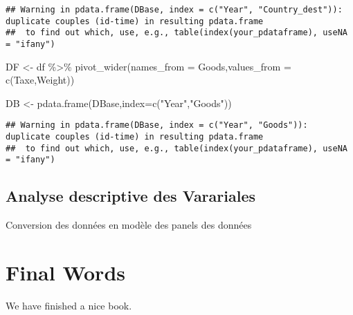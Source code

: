 \documentclass[
]{book}
\newenvironment{Shaded}{\begin{snugshade}}{\end{snugshade}}
\newcommand{\AttributeTok}[1]{\textcolor[rgb]{0.77,0.63,0.00}{#1}}
\newcommand{\FunctionTok}[1]{\textcolor[rgb]{0.00,0.00,0.00}{#1}}
\newcommand{\NormalTok}[1]{#1}
\newcommand{\OtherTok}[1]{\textcolor[rgb]{0.56,0.35,0.01}{#1}}
\newcommand{\SpecialCharTok}[1]{\textcolor[rgb]{0.00,0.00,0.00}{#1}}
\newcommand{\StringTok}[1]{\textcolor[rgb]{0.31,0.60,0.02}{#1}}
\begin{document}
\begin{verbatim}
## Warning in pdata.frame(DBase, index = c("Year", "Country_dest")): duplicate couples (id-time) in resulting pdata.frame
##  to find out which, use, e.g., table(index(your_pdataframe), useNA = "ifany")
\end{verbatim}

\begin{Shaded}
\begin{Highlighting}[]
\NormalTok{DF }\OtherTok{\textless{}{-}}\NormalTok{ df }\SpecialCharTok{\%\textgreater{}\%} \FunctionTok{pivot\_wider}\NormalTok{(}\AttributeTok{names\_from =}\NormalTok{ Goods,}\AttributeTok{values\_from =} \FunctionTok{c}\NormalTok{(Taxe,Weight))}
\end{Highlighting}
\end{Shaded}

\begin{Shaded}
\begin{Highlighting}[]
\NormalTok{DB }\OtherTok{\textless{}{-}} \FunctionTok{pdata.frame}\NormalTok{(DBase,}\AttributeTok{index=}\FunctionTok{c}\NormalTok{(}\StringTok{"Year"}\NormalTok{,}\StringTok{"Goods"}\NormalTok{))}
\end{Highlighting}
\end{Shaded}

\begin{verbatim}
## Warning in pdata.frame(DBase, index = c("Year", "Goods")): duplicate couples (id-time) in resulting pdata.frame
##  to find out which, use, e.g., table(index(your_pdataframe), useNA = "ifany")
\end{verbatim}

\hypertarget{analyse-descriptive-des-varariales}{%
\section{Analyse descriptive des Varariales}\label{analyse-descriptive-des-varariales}}

Conversion des données en modèle des panels des données

\hypertarget{final-words}{%
\chapter{Final Words}\label{final-words}}

We have finished a nice book.

  
\end{document}
